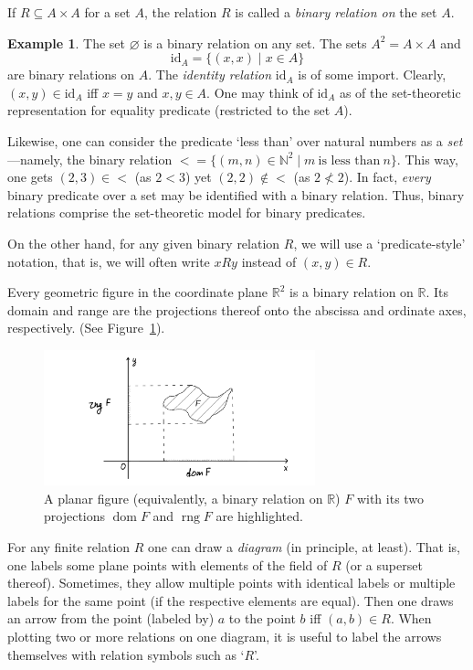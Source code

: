 \documentclass[12pt,notitlepage]{article}
\theoremstyle{plain}
\theoremstyle{definition}
\newtheorem{exm}[thm]{Example}
\theoremstyle{plain}
\newcommand{\N}{\mathbb{N}}
\newcommand{\R}{\mathbb{R}}
\newcommand{\sbs}{\subseteq}
\newcommand{\void}{\varnothing}
\newcommand{\dom}{\mathop{\mathrm{dom}}}
\newcommand{\rng}{\mathop{\mathrm{rng}}}
\newcommand{\id}{\mathrm{id}}
\newcommand{\1}{\mathbf{1}}
\newcommand{\0}{\mathbf{0}}
\begin{document}
If $R \sbs A \times A$ for a set $A$, the relation $R$ is called a \emph{binary relation on} the set $A$.
\begin{exm}
The set $\void$ is a binary relation on any set. The sets $A^2 = A \times A$ and
$$\id_A = \{(x,x) \mid x \in A \}$$
are binary relations on $A$. The \emph{identity relation} $\id_A$ is of some import. Clearly, $(x,y) \in \id_A$ iff $x = y$ and $x,y \in A$. One may think of $\id_A$ as of the set-theoretic representation for equality predicate (restricted to the set $A$).

Likewise, one can consider the predicate `less than' over natural numbers as a \emph{set}---namely, the binary relation ${<} = \{ (m, n) \in \N^2 \mid m\ \mbox{is less than}\ n\}$. This way, one gets $(2,3) \in {<}$ (as $2 < 3$) yet $(2,2) \notin {<}$ (as $2 \not< 2$). In fact, \emph{every} binary predicate over a set may be identified with a binary relation. Thus, binary relations comprise the set-theoretic model for binary predicates.

On the other hand, for any given binary relation $R$, we will use a `predicate-style' notation, that is, we will often write $x R y$ instead of $(x,y) \in R$.

Every geometric figure in the coordinate plane $\R^2$ is a binary relation on $\R$. Its domain and range are the projections thereof onto the abscissa and ordinate axes, respectively. (See Figure~\ref{rel:proj}).
\begin{figure}[h]
\centering
\includegraphics*[width=0.7\textwidth]{rel_proj.pdf}
\caption{\label{rel:proj} A planar figure (equivalently, a binary relation on $\R$) $F$ with its two projections $\dom F$ and $\rng F$ are highlighted.}
\end{figure}
\end{exm}

For any finite relation $R$ one can draw a \emph{diagram} (in principle, at least). That is, one labels some plane points with elements of the field of $R$ (or a superset thereof). Sometimes, they allow multiple points with identical labels or multiple labels for the same point (if the respective elements are equal). Then one draws an arrow from the point (labeled by) $a$ to the point $b$ iff $(a,b) \in R$. When plotting two or more relations on one diagram, it is useful to label the arrows themselves with relation symbols such as `$R$'.
\end{document}

